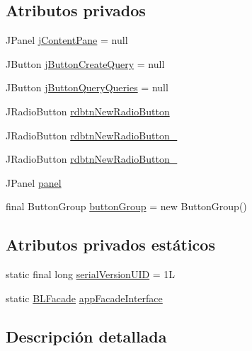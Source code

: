 \subsection*{Atributos privados}
\begin{DoxyCompactItemize}
\item 
J\+Panel \mbox{\hyperlink{classgui_1_1MainGUI2_a814dd148cfa183baefc197af2e743465}{j\+Content\+Pane}} = null
\item 
J\+Button \mbox{\hyperlink{classgui_1_1MainGUI2_a823df1e5df1fa562352500c85738ad5a}{j\+Button\+Create\+Query}} = null
\item 
J\+Button \mbox{\hyperlink{classgui_1_1MainGUI2_a9a622ef3a316e94fc301b0df09804880}{j\+Button\+Query\+Queries}} = null
\item 
J\+Radio\+Button \mbox{\hyperlink{classgui_1_1MainGUI2_a5303de7b7eb173a2eade6931958fbd41}{rdbtn\+New\+Radio\+Button}}
\item 
J\+Radio\+Button \mbox{\hyperlink{classgui_1_1MainGUI2_aa72769786b7fc96ddae9cf0d4a07de03}{rdbtn\+New\+Radio\+Button\+\_}}
\item 
J\+Radio\+Button \mbox{\hyperlink{classgui_1_1MainGUI2_a03317209b7881d450aad60ca05de1838}{rdbtn\+New\+Radio\+Button\+\_}}
\item 
J\+Panel \mbox{\hyperlink{classgui_1_1MainGUI2_aa9d49687621bbcc74f40c9063adbc2fa}{panel}}
\item 
final Button\+Group \mbox{\hyperlink{classgui_1_1MainGUI2_af9db5ce5da5af9ba51eead7f5f20a4e8}{button\+Group}} = new Button\+Group()
\end{DoxyCompactItemize}
\subsection*{Atributos privados estáticos}
\begin{DoxyCompactItemize}
\item 
static final long \mbox{\hyperlink{classgui_1_1MainGUI2_a4f9e958204505c30484643bb4dc7a6b0}{serial\+Version\+U\+ID}} = 1L
\item 
static \mbox{\hyperlink{interfacebusinessLogic_1_1BLFacade}{B\+L\+Facade}} \mbox{\hyperlink{classgui_1_1MainGUI2_a1b35180c398b8bea7288e1d5892b33ba}{app\+Facade\+Interface}}
\end{DoxyCompactItemize}


\subsection{Descripción detallada}


